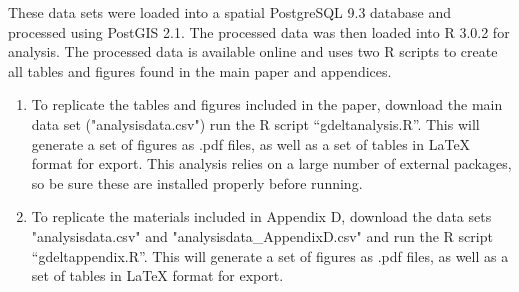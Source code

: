 \documentclass[hidelinks]{article}
\begin{document}
These data sets were loaded into a spatial PostgreSQL 9.3 database and processed using PostGIS 2.1. The processed data was then loaded into R 3.0.2 for analysis. The processed data is available online and uses two R scripts to create all tables and figures found in the main paper and appendices. 

\begin{enumerate}
\item To replicate the tables and figures included in the paper, download the main data set ("analysisdata.csv") run the R script ``gdeltanalysis.R''. This will generate a set of figures as .pdf files, as well as a set of tables in LaTeX format for export. This analysis relies on a large number of external packages, so be sure these are installed properly before running.
\item To replicate the materials included in Appendix D, download the data sets "analysisdata.csv" and "analysisdata\_AppendixD.csv" and run the R script ``gdeltappendix.R''. This will generate a set of figures as .pdf files, as well as a set of tables in LaTeX format for export.
\end{enumerate}

\nocite{*} 


\end{document}
